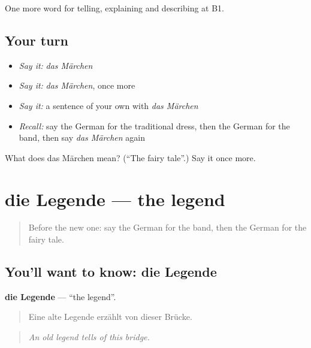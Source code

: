 \begin{grammarlens}[title={What you've built}]
One more word for telling, explaining and describing at B1.
\end{grammarlens}

\subsection*{Your turn}
\begin{itemize}
\raggedright
  \item \emph{Say it:} \emph{das Märchen}
  \item \emph{Say it:} \emph{das Märchen}, once more
  \item \emph{Say it:} a sentence of your own with \emph{das Märchen}
  \item \emph{Recall:} say the German for the traditional dress, then the German for the band, then say \emph{das Märchen} again
\end{itemize}

\begin{tcolorbox}[breakable,colback=teal!4,colframe=teal!35!black,title={Before you move on}]
What does das Märchen mean? (\textquotedblleft{}The fairy tale\textquotedblright{}.) Say it once more.
\end{tcolorbox}
\section[die Legende]{die Legende — the legend}

\label{lesson:GE-C313-legende}



\begin{quote}
Before the new one: say the German for the band, then the German for the fairy tale.
\end{quote}

\subsection*{You'll want to know: die Legende}
\textbf{die Legende} — \textquotedblleft{}the legend\textquotedblright{}.

\begin{quote}
Eine alte Legende erzählt von dieser Brücke.
\end{quote}

\begin{quote}
\emph{An old legend tells of this bridge.}
\end{quote}

